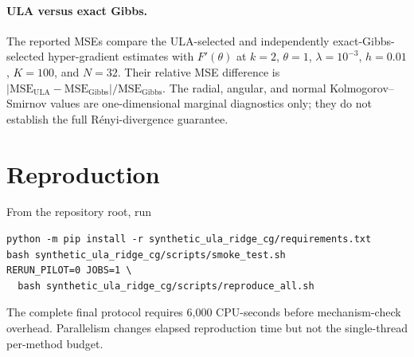 \documentclass[10pt]{article}
\begin{document}
\paragraph{ULA versus exact Gibbs.}
The reported MSEs compare the ULA-selected and independently exact-Gibbs-
selected hyper-gradient estimates with $F'(\theta)$ at
$k=2$, $\theta=1$, $\lambda=10^{-3}$, $h=0.01$, $K=100$, and $N=32$.
Their relative MSE difference is
$|\mathrm{MSE}_{\mathrm{ULA}}-\mathrm{MSE}_{\mathrm{Gibbs}}|
/\mathrm{MSE}_{\mathrm{Gibbs}}$.  The radial, angular, and normal
Kolmogorov--Smirnov values are one-dimensional marginal diagnostics only;
they do not establish the full R\'enyi-divergence guarantee.



\section{Reproduction}

From the repository root, run
\begin{verbatim}
python -m pip install -r synthetic_ula_ridge_cg/requirements.txt
bash synthetic_ula_ridge_cg/scripts/smoke_test.sh
RERUN_PILOT=0 JOBS=1 \
  bash synthetic_ula_ridge_cg/scripts/reproduce_all.sh
\end{verbatim}
The complete final protocol requires 6,000 CPU-seconds before mechanism-check
overhead.  Parallelism changes elapsed reproduction time but not the
single-thread per-method budget.
\end{document}
